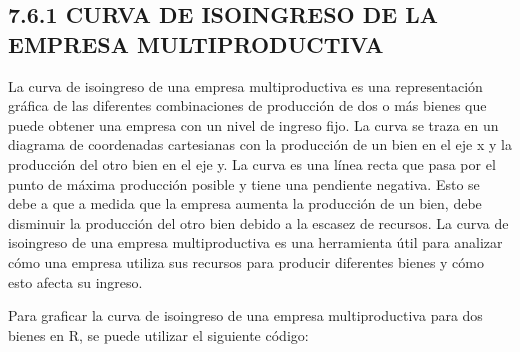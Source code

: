 \documentclass[
  spanish,
  12pt,
]{book}
\begin{document}
\subsection{7.6.1 CURVA DE ISOINGRESO DE LA EMPRESA
MULTIPRODUCTIVA}\label{curva-de-isoingreso-de-la-empresa-multiproductiva}

La curva de isoingreso de una empresa multiproductiva es una
representación gráfica de las diferentes combinaciones de producción de
dos o más bienes que puede obtener una empresa con un nivel de ingreso
fijo. La curva se traza en un diagrama de coordenadas cartesianas con la
producción de un bien en el eje x y la producción del otro bien en el
eje y. La curva es una línea recta que pasa por el punto de máxima
producción posible y tiene una pendiente negativa. Esto se debe a que a
medida que la empresa aumenta la producción de un bien, debe disminuir
la producción del otro bien debido a la escasez de recursos. La curva de
isoingreso de una empresa multiproductiva es una herramienta útil para
analizar cómo una empresa utiliza sus recursos para producir diferentes
bienes y cómo esto afecta su ingreso.

Para graficar la curva de isoingreso de una empresa multiproductiva para
dos bienes en R, se puede utilizar el siguiente código:

\newpage
\end{document}
